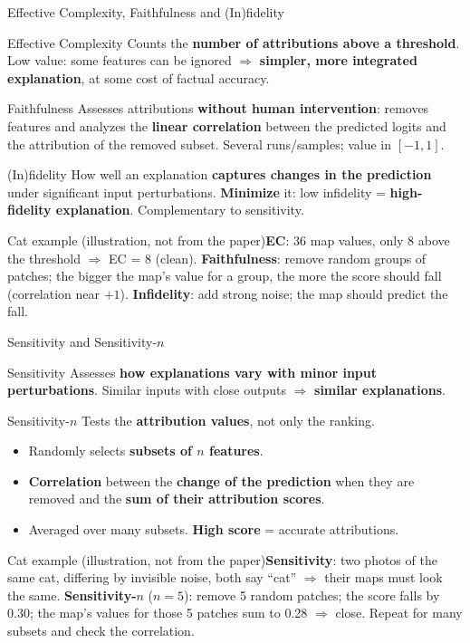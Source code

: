 \documentclass[10pt]{beamer}
\newcommand{\catex}[1]{\begin{exampleblock}{\footnotesize Cat example (illustration, not from the paper)}\footnotesize #1\end{exampleblock}}
\begin{document}
\begin{frame}{Effective Complexity, Faithfulness and (In)fidelity}
\scriptsize
\begin{block}{Effective Complexity}
Counts the \textbf{number of attributions above a threshold}. Low value: some features can be ignored $\Rightarrow$ \textbf{simpler, more integrated explanation}, at some cost of factual accuracy.
\end{block}
\begin{block}{Faithfulness}
Assesses attributions \textbf{without human intervention}: removes features and analyzes the \textbf{linear correlation} between the predicted logits and the attribution of the removed subset. Several runs/samples; value in \textbf{$[-1,1]$}.
\end{block}
\begin{block}{(In)fidelity}
How well an explanation \textbf{captures changes in the prediction} under significant input perturbations. \textbf{Minimize} it: low infidelity = \textbf{high-fidelity explanation}. Complementary to sensitivity.
\end{block}
\catex{\textbf{EC}: 36 map values, only 8 above the threshold $\Rightarrow$ EC = 8 (clean). \textbf{Faithfulness}: remove random groups of patches; the bigger the map's value for a group, the more the score should fall (correlation near $+1$). \textbf{Infidelity}: add strong noise; the map should predict the fall.}
\end{frame}

\begin{frame}{Sensitivity and Sensitivity-$n$}
\begin{block}{Sensitivity}
Assesses \textbf{how explanations vary with minor input perturbations}. Similar inputs with close outputs $\Rightarrow$ \textbf{similar explanations}.
\end{block}
\begin{block}{Sensitivity-$n$}
Tests the \textbf{attribution values}, not only the ranking.
\begin{itemize}\small
\item Randomly selects \textbf{subsets of $n$ features}.
\item \textbf{Correlation} between the \textbf{change of the prediction} when they are removed and the \textbf{sum of their attribution scores}.
\item Averaged over many subsets. \textbf{High score} = accurate attributions.
\end{itemize}
\end{block}
\catex{\textbf{Sensitivity}: two photos of the same cat, differing by invisible noise, both say ``cat'' $\Rightarrow$ their maps must look the same. \textbf{Sensitivity-$n$} ($n=5$): remove 5 random patches; the score falls by 0.30; the map's values for those 5 patches sum to 0.28 $\Rightarrow$ close. Repeat for many subsets and check the correlation.}
\end{frame}
\end{document}

